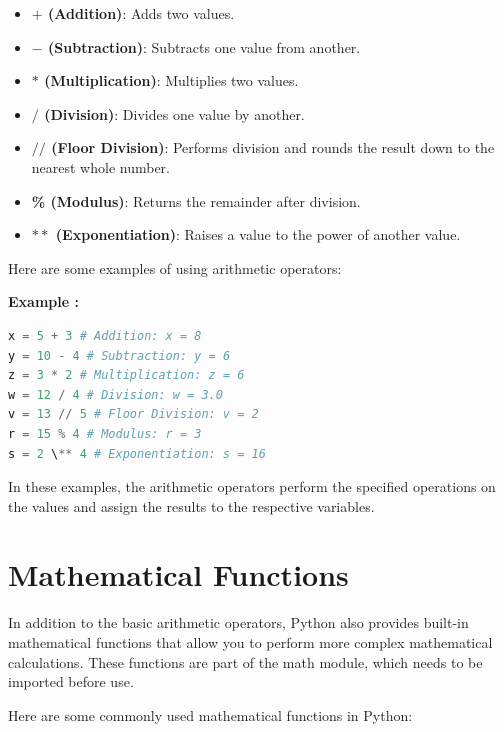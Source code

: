 \documentclass[12pt]{book}
\newtheorem{Example}{Example}[chapter]
\renewenvironment{Example}{\begin{trivlist}\item\relax
\textbf{Example \thesection: }}{\end{trivlist}}
\begin{document}
\begin{itemize}
\item \textbf{$+$ (Addition)}: Adds two values.
\item \textbf{$-$ (Subtraction)}: Subtracts one value from another.
\item \textbf{$*$ (Multiplication)}: Multiplies two values.
\item \textbf{$/$ (Division)}: Divides one value by another.
\item \textbf{$//$ (Floor Division)}: Performs division and rounds the result down to the nearest whole number.
\item \textbf{\% (Modulus)}: Returns the remainder after division.
\item \textbf{$**$ (Exponentiation)}: Raises a value to the power of another value.
\end{itemize}

Here are some examples of using arithmetic operators:

\begin{Example}
\begin{lstlisting}[language=Python]
x = 5 + 3 # Addition: x = 8
y = 10 - 4 # Subtraction: y = 6
z = 3 * 2 # Multiplication: z = 6
w = 12 / 4 # Division: w = 3.0
v = 13 // 5 # Floor Division: v = 2
r = 15 % 4 # Modulus: r = 3
s = 2 \** 4 # Exponentiation: s = 16
\end{lstlisting}
\end{Example}

In these examples, the arithmetic operators perform the specified operations on the values and assign the results to the respective variables.

\section{Mathematical Functions}

In addition to the basic arithmetic operators, Python also provides built-in mathematical functions that allow you to perform more complex mathematical calculations. These functions are part of the math module, which needs to be imported before use.

Here are some commonly used mathematical functions in Python:
\end{document}
